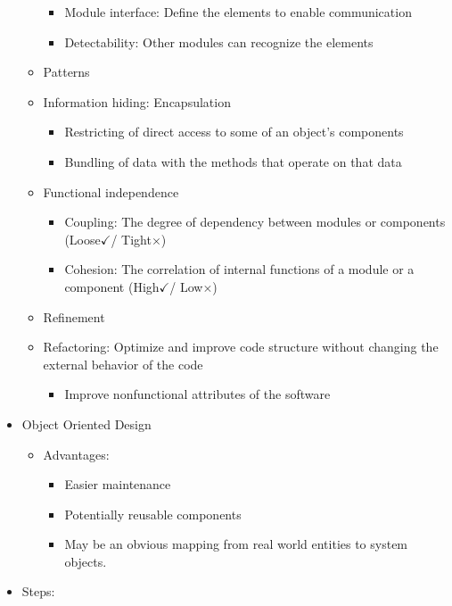 \documentclass[12pt,openany]{book}
\begin{document}
\begin{itemize}
\begin{itemize}
\begin{itemize}
            \item Module interface: Define the elements to enable communication
            \item Detectability: Other modules can recognize the elements
        \end{itemize}
        \item Patterns
        \item Information hiding: Encapsulation
        \begin{itemize}
            \item Restricting of direct access to some of an object's components
            \item Bundling of data with the methods that operate on that data
        \end{itemize}
        \item Functional independence
        \begin{itemize}
            \item Coupling: The degree of dependency between modules or components (Loose$\checkmark$/ Tight$\times$)
            \item Cohesion: The correlation of internal functions of a module or a component (High$\checkmark$/ Low$\times$)
        \end{itemize}
        \item Refinement
        \item Refactoring: Optimize and improve code structure without changing the external behavior of the code
        \begin{itemize}
            \item Improve nonfunctional attributes of the software
        \end{itemize}
    \end{itemize}
    \item Object Oriented Design
    \begin{itemize}
        \item Advantages:
        \begin{itemize}
            \item Easier maintenance
            \item Potentially reusable components 
            \item May be an obvious mapping from real world entities to system objects.
        \end{itemize}
    \end{itemize}
    \item Steps:
    \begin{enumerate}

\end{enumerate}
\end{itemize}
\end{document}
